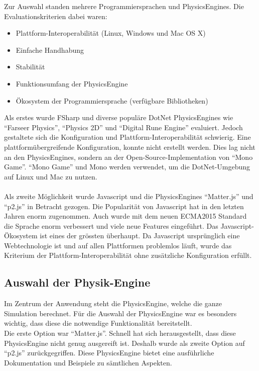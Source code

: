     Zur Auswahl standen mehrere Programmiersprachen und \glspl{PhysicsEngine}.
    Die Evaluationskriterien dabei waren:

    \begin{itemize}
      \item Plattform-Interoperabilität (Linux, Windows und Mac OS X)
      \item Einfache Handhabung
      \item Stabilität
      \item Funktionsumfang der \gls{PhysicsEngine}
      \item Ökosystem der Programmiersprache (verfügbare Bibliotheken)
    \end{itemize}

    Als erstes wurde \gls{FSharp} und diverse populäre \gls{DotNet} \glspl{PhysicsEngine} wie ``Farseer Physics'',
    ``Physics 2D'' und ``Digital Rune Engine'' evaluiert.
    Jedoch gestaltete sich die Konfiguration und Plattform-Interoperabilität schwierig.
    Eine plattformübergreifende Konfiguration, konnte nicht erstellt werden.
    Dies lag nicht an den \glspl{PhysicsEngine}, sondern an der Open-Source-Implementation von ``Mono Game''.
    ``Mono Game'' und Mono werden verwendet, um die \gls{DotNet}-Umgebung auf Linux und Mac zu nutzen.
    \\
    \\
    Als zweite Möglichkeit wurde Javascript und die \glspl{PhysicsEngine} ``Matter.js'' und ``p2.js'' in Betracht gezogen.
    Die Popularität von Javascript hat in den letzten Jahren enorm zugenommen.
    Auch wurde mit dem neuen ECMA2015 Standard die Sprache enorm verbessert und viele neue Features eingeführt.
    Das Javascript-Ökosystem ist eines der grössten überhaupt.
    Da Javascript ursprünglich eine Webtechnologie ist und auf allen Plattformen problemlos läuft,
    wurde das Kriterium der Plattform-Interoperabilität ohne zusätzliche Konfiguration erfüllt.

    \subsection{Auswahl der Physik-Engine}

      Im Zentrum der Anwendung steht die \gls{PhysicsEngine}, welche die ganze Simulation berechnet.
      Für die Auswahl der \gls{PhysicsEngine} war es besonders wichtig,
      dass diese die notwendige Funktionalität bereitstellt.
      \\
      Die erste Option war ``Matter.js''. Schnell hat sich herausgestellt,
      dass diese \gls{PhysicsEngine} nicht genug ausgereift ist.
      Deshalb wurde als zweite Option auf ``p2.js'' zurückgegriffen.
      Diese \gls{PhysicsEngine} bietet eine ausführliche Dokumentation und Beispiele zu sämtlichen Aspekten.

